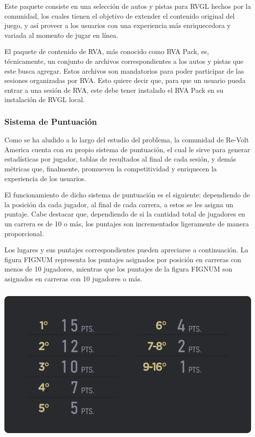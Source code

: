 Este paquete consiste en una selección de autos y pistas para RVGL hechos por la comunidad, los cuales tienen el objetivo de extender el contenido original del juego, y así proveer a los usuarios con una experiencia más enriquecedora y variada al momento de jugar en línea.

El paquete de contenido de RVA, más conocido como RVA Pack, es, técnicamente, un conjunto de archivos correspondientes a los autos y pistas que este busca agregar. Estos archivos son mandatorios para poder participar de las sesiones organizadas por RVA. Esto quiere decir que, para que un usuario pueda entrar a una sesión de RVA, este debe tener instalado el RVA Pack en su instalación de RVGL local.

\subsubsection{Sistema de Puntuación}
Como se ha aludido a lo largo del estudio del problema, la comunidad de Re-Volt America cuenta con su propio sistema de puntuación, el cual le sirve para generar estadísticas por jugador, tablas de resultados al final de cada sesión, y demás métricas que, finalmente, promueven la competitividad y enriquecen la experiencia de los usuarios.

El funcionamiento de dicho sistema de puntuación es el siguiente: dependiendo de la posición da cada jugador, al final de cada carrera, a estos se les asigna un puntaje. Cabe destacar que, dependiendo de si la cantidad total de jugadores en un carrera es de 10 o más, los puntajes son incrementados ligeramente de manera proporcional.

Los lugares y sus puntajes correspondientes pueden apreciarse a continuación. La figura FIGNUM representa los puntajes asignados por posición en carreras con menos de 10 jugadores, mientras que los puntajes de la figura FIGNUM son asignados en carreras con 10 jugadores o más.

\includegraphics[width=15cm, height=8cm]{img/points.png}

